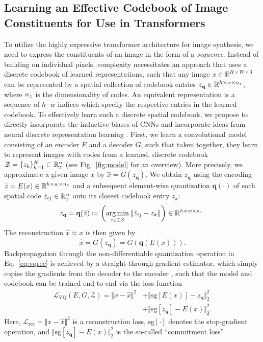 \documentclass[final]{cvpr}
\newcommand{\RR}{\mathbb{R}}
\newcommand{\codebook}{\mathcal{Z}}
\newcommand{\decoder}{G}
\newcommand{\encoder}{E}
\newcommand{\quantize}{\mathbf{q}}
\newcommand{\quantizedcode}{z_{\mathbf{q}}}
\DeclareMathOperator*{\argmin}{arg\,min}
\begin{document}
\subsection{Learning an Effective Codebook of Image Constituents for Use in Transformers}
\label{sec:vqgan}
\noindent To utilize the highly expressive transformer architecture for image synthesis, we need to 
express the constituents of an image in the form of a \emph{sequence}.
%
Instead of building on individual pixels, complexity necessitates
an approach that uses a discrete codebook of learned representations,
such that any image $x \in \RR^{H \times W \times 3}$ can be represented by a
spatial collection of codebook entries $\quantizedcode \in \RR^{h \times w
\times \codebookdim}$, where $n_z$ is the dimensionality of codes.
An equivalent representation is a sequence of $h\cdot w$ indices which specify
the respective entries in the learned codebook.
To effectively learn such a discrete spatial codebook, we propose to directly
incorporate the inductive biases of 
CNNs and incorporate ideas from neural discrete representation learning \cite{oord2018neural}.
First, we learn a convolutional model
consisting of an encoder $\encoder$ and a decoder $\decoder$, such that taken
together, they learn to represent images with codes from a
learned, discrete codebook $\codebook = \{z_k\}_{k=1}^K \subset
\RR^\codebookdim$ (see Fig.~\ref{fig:model} for an overview).
%
%
%
%
More precisely, we approximate a given image $x$ by $\hat{x}=G(\quantizedcode)$. We
obtain $\quantizedcode$ using the encoding $ \hat{z} = \encoder(x) \in \RR^{h\times w \times
\codebookdim}$ and a subsequent element-wise quantization $\quantize(\cdot)$ of each spatial code
$\hat{z}_{ij} \in \RR^\codebookdim$ onto its closest codebook entry $z_k$:
%
\begin{equation}
  \quantizedcode = \quantize(\hat{z}) \coloneqq
  \left(\argmin_{z_k \in \codebook} \Vert \hat{z}_{ij} - z_k \Vert\right)
  \in \RR^{h\times w \times \codebookdim}.
\end{equation} 
The reconstruction $\hat{x} \approx x$ is then given by 
\begin{equation}
%
  \hat{x} = \decoder(\quantizedcode ) = \decoder\left(
    \quantize(\encoder(x)) \right).
\label{eq:vqrec}
\end{equation}
Backpropagation through the non-differentiable quantization operation in
Eq.~\eqref{eq:vqrec} is achieved by a straight-through gradient estimator,
which simply copies the gradients from the decoder to the encoder
\cite{bengio2013estimating}, such that the model and codebook can be trained end-to-end
via the loss function
\begin{align}
%
%
\mathcal{L}_{\text{VQ}}(\encoder, \decoder, \codebook) = \Vert x - \hat{x} \Vert^2 
  &+ \Vert \text{sg}[\encoder(x)] - \quantizedcode \Vert_2^2 \nonumber \\ &+ \Vert \text{sg}[\quantizedcode] - \encoder(x) \Vert_2^2.
\label{eq:origvqloss}
\end{align}
%
%
Here, $\mathcal{L}_{\text{rec}}=\Vert x - \hat{x} \Vert^2$ is a reconstruction loss,
$\text{sg}[\cdot]$ denotes the stop-gradient operation, and
$\Vert \text{sg}[\quantizedcode] - \encoder(x) \Vert_2^2$ is the so-called
``commitment loss'' \cite{oord2018neural}.
%
\end{document}
